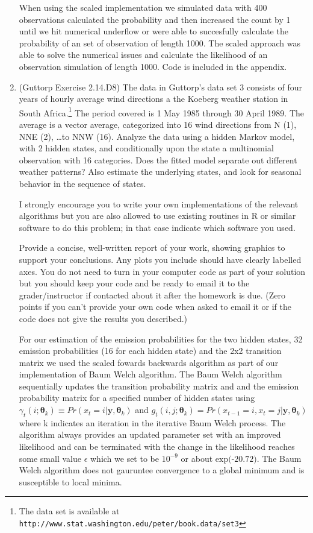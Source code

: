\documentclass{article} %
\begin{document}
\begin{enumerate}
When using the scaled implementation we simulated data with 400 observations
calculated the probability and then increased the count by 1 until we hit
numerical underflow or were able to succesfully calculate the probability
of an set of observation of length 1000. The scaled approach was able to solve the
numerical issues and calculate the likelihood of an observation simulation of
length 1000. Code is included in the appendix.

\item (Guttorp Exercise 2.14.D8) The data in Guttorp's data set 3
  consists of four years of hourly average wind directions a the
  Koeberg weather station in South Africa.\footnote{The data set is
    available at {\tt
      http://www.stat.washington.edu/peter/book.data/set3}
  } The period covered is 1 May 1985 through 30
  April 1989.  The average is a vector average, categorized into 16
  wind directions from N (1), NNE (2), \dots to NNW (16).  Analyze the
  data using a hidden Markov model, with 2 hidden states, and
  conditionally upon the state a multinomial observation with 16
  categories.  Does the fitted model separate out different weather
  patterns?  Also estimate the underlying states, and look for
  seasonal behavior in the sequence of states.

  I strongly encourage you to write your own implementations of the
  relevant algorithms but you are also allowed to use existing
  routines in R or similar software to do this problem; in that case
  indicate which software you used.

  Provide a concise, well-written report of your work, showing
  graphics to support your conclusions.  Any plots you include should
  have clearly labelled axes.  You do not need to turn in your
  computer code as part of your solution but you should keep your code
  and be ready to email it to the grader/instructor if contacted about
  it after the homework is due.  (Zero points if you can't provide
  your own code when asked to email it or if the code does not give
  the results you described.)

For our estimation of the emission probabilities for the two hidden states, 32 emission probabilities (16 for each hidden state) and
the 2x2 transition matrix we used the scaled fowards backwards algorithm as
part of our implementation of Baum Welch algorithm. The Baum Welch algorithm
sequentially updates the transition probability matrix and and the emission
probability matrix for a specified number of hidden states using
$\gamma_t(i;\boldsymbol{\theta}_k) \equiv Pr(x_t = i | \mathbf{y}, \boldsymbol{\theta}_k)$ and
$g_t(i,j;\boldsymbol{\theta}_k) = Pr(x_{t-1} = i, x_t = j | \mathbf{y}, \boldsymbol{\theta}_k)$
where k indicates an iteration in the iterative Baum Welch process. The algorithm
always provides an updated parameter set with an improved likelihood and can
be terminated with the change in the likelihood reaches some small value
$\epsilon$ which we set to be $10^{-9}$ or about $\text{exp(-20.72)}$. The Baum Welch algorithm does not
gauruntee convergence to a global minimum and is susceptible to local minima.


\end{enumerate}
\end{document}
